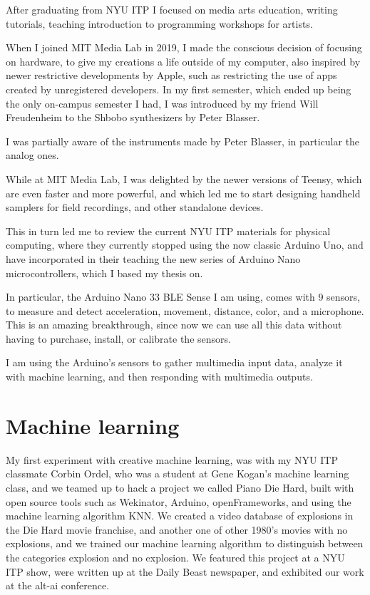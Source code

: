 After graduating from NYU ITP I focused on media arts education, writing tutorials, teaching introduction to programming workshops for artists.

When I joined MIT Media Lab in 2019, I made the conscious decision of focusing on hardware, to give my creations a life outside of my computer, also inspired by newer restrictive developments by Apple, such as restricting the use of apps created by unregistered developers. In my first semester, which ended up being the only on-campus semester I had, I was introduced by my friend Will Freudenheim to the Shbobo synthesizers by Peter Blasser.

I was partially aware of the instruments made by Peter Blasser, in particular the analog ones.

While at MIT Media Lab, I was delighted by the newer versions of Teensy, which are even faster and more powerful, and which led me to start designing handheld samplers for field recordings, and other standalone devices.

This in turn led me to review the current NYU ITP materials for physical computing, where they currently stopped using the now classic Arduino Uno, and have incorporated in their teaching the new series of Arduino Nano microcontrollers, which I based my thesis on.

In particular, the Arduino Nano 33 BLE Sense I am using, comes with 9 sensors, to measure and detect acceleration, movement, distance, color, and a microphone. This is an amazing breakthrough, since now we can use all this data without having to purchase, install, or calibrate the sensors.

I am using the Arduino's sensors to gather multimedia input data, analyze it with machine learning, and then responding with multimedia outputs.

\section{Machine learning}

My first experiment with creative machine learning, was with my NYU ITP classmate Corbin Ordel, who was a student at Gene Kogan's machine learning class, and we teamed up to hack a project we called Piano Die Hard, built with open source tools such as Wekinator, Arduino, openFrameworks, and using the machine learning algorithm KNN. We created a video database of explosions in the Die Hard movie franchise, and another one of other 1980's movies with no explosions, and we trained our machine learning algorithm to distinguish between the categories explosion and no explosion. We featured this project at a NYU ITP show, were written up at the Daily Beast newspaper, and exhibited our work at the alt-ai conference.

